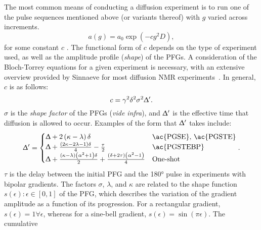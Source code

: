 The most common means of conducting a diffusion experiment is to run one of the
pulse sequences mentioned above (or variants thereof) with $g$ varied across
increments.
\label{corr:stej-tann}
\begin{equation}
    a(g) = a_0 \exp\left(- c g^2 D\right),
\end{equation}
for some constant $c$ \correction{(\unit{\second\per\tesla\squared})}\label{corr:c-unit}.
The functional form of $c$ depends on the type of experiment used, as well as
the amplitude profile (\emph{shape}) of the \acp{PFG}.
A consideration of the Bloch-Torrey equations for a given experiment is
necessary, with an extensive overview provided by Sinnaeve for most diffusion
NMR experiments~\cite{Sinnaeve2012}. In general, $c$ is as follows:
\begin{equation}
    c = \gamma^2 \delta^2 \sigma^2 \Updelta^{\prime}.
    \label{eq:stejskal_tanner_generic}
\end{equation}
$\sigma$ is the \emph{shape factor} of the \acp{PFG} (\textit{vide infra}),
and $\Updelta^{\prime}$ is the effective time that diffusion is allowed
to occur. Examples of the form that $\Updelta^{\prime}$ takes include:
\begin{equation}
    \Updelta^{\prime} =
    \begin{cases}
        \Updelta + 2 \left(\kappa - \lambda\right) \delta &
        \text{\ac{PGSE}, \ac{PGSTE}}\\
        \Updelta + \frac{\left(2 \kappa - 2 \lambda - 1\right)\delta}{4} - \frac{\tau}{2} &
        \text{\ac{PGSTEBP}} \\
        \Updelta + \frac{\left(\kappa - \lambda\right)
            \left(\alpha^2 + 1\right) \delta}{2} +
        \frac{\left(\delta + 2 \tau\right)\left(\alpha^2 - 1\right)}{4} &
        \text{One-shot}
    \end{cases}.
    \label{eq:Delta-prime}
\end{equation}
$\tau$ is the delay between the initial \ac{PFG} and the \ang{180} pulse in
experiments with bipolar gradients.
The factors $\sigma$,  $\lambda$, and $\kappa$ are related to the shape
function $s(\epsilon) : \epsilon \in [0, 1]$ of the \ac{PFG}, which describes
the variation of the gradient amplitude as a function of its progression.
For a rectangular gradient, $s(\epsilon) = 1 \forall \epsilon$, whereas for a
sine-bell gradient, $s(\epsilon) = \sin(\pi \epsilon)$. The cumulative
